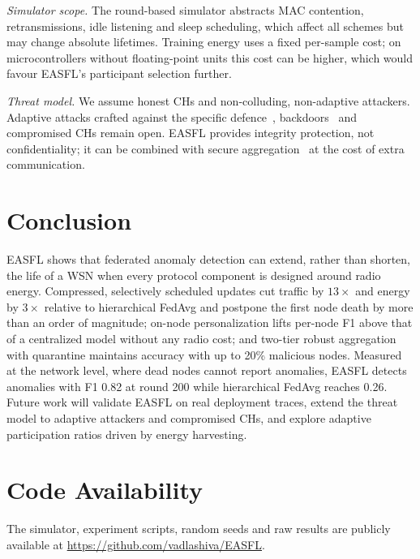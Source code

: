 \documentclass[journal,onecolumn,draftclsnofoot,12pt]{IEEEtran}
\begin{document}
\textit{Simulator scope.} The round-based simulator abstracts MAC contention, retransmissions, idle listening and sleep scheduling, which affect all schemes but may change absolute lifetimes. Training energy uses a fixed per-sample cost; on microcontrollers without floating-point units this cost can be higher, which would favour EASFL's participant selection further.

\textit{Threat model.} We assume honest CHs and non-colluding, non-adaptive attackers. Adaptive attacks crafted against the specific defence~\cite{fang2020}, backdoors~\cite{bagdasaryan2020} and compromised CHs remain open. EASFL provides integrity protection, not confidentiality; it can be combined with secure aggregation~\cite{bonawitz2017} at the cost of extra communication.

\section{Conclusion}
EASFL shows that federated anomaly detection can extend, rather than shorten, the life of a WSN when every protocol component is designed around radio energy. Compressed, selectively scheduled updates cut traffic by $13\times$ and energy by $3\times$ relative to hierarchical FedAvg and postpone the first node death by more than an order of magnitude; on-node personalization lifts per-node F1 above that of a centralized model without any radio cost; and two-tier robust aggregation with quarantine maintains accuracy with up to 20\% malicious nodes. Measured at the network level, where dead nodes cannot report anomalies, EASFL detects anomalies with F1 0.82 at round 200 while hierarchical FedAvg reaches 0.26. Future work will validate EASFL on real deployment traces, extend the threat model to adaptive attackers and compromised CHs, and explore adaptive participation ratios driven by energy harvesting.

\section*{Code Availability}
The simulator, experiment scripts, random seeds and raw results are publicly available at \url{https://github.com/vadlashiva/EASFL}.



\end{document}
